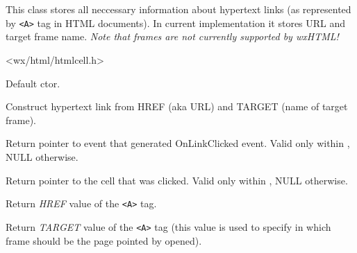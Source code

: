 \section{}\label{wxhtmllinkinfo}

This class stores all neccessary information about hypertext
links (as represented by {\tt <A>} tag in HTML documents). In 
current implementation it stores URL and target frame name. 
{\it Note that frames are not currently supported by wxHTML!}




<wx/html/htmlcell.h>


\label{wxhtmllinkinfowxhtmllinkinfo}


Default ctor.


Construct hypertext link from HREF (aka URL) and TARGET (name of target
frame).

\label{wxhtmllinkinfogetevent}


Return pointer to event that generated OnLinkClicked event. Valid
only within ,
NULL otherwise.

\label{wxhtmllinkinfogethtmlcell}


Return pointer to the cell that was clicked. Valid
only within ,
NULL otherwise.


\label{wxhtmllinkinfogethref}


Return {\it HREF} value of the {\tt <A>} tag.

\label{wxhtmllinkinfogettarget}


Return {\it TARGET} value of the {\tt <A>} tag (this value
is used to specify in which frame should be the page pointed
by  opened).

